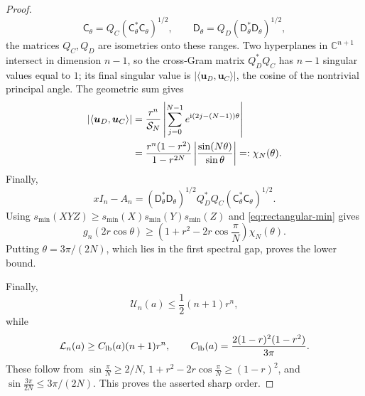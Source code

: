 \documentclass[12pt,anonymous]{iopjournal}
\numberwithin{equation}{section}
\theoremstyle{remark}
\newcommand{\C}{\mathbb C}
\newcommand{\ii}{\mathrm i}
\begin{document}
\begin{proof}
\[
 \mathsf{C}_\theta=Q_C(\mathsf{C}_\theta^*\mathsf{C}_\theta)^{1/2},
 \qquad
 \mathsf{D}_\theta=Q_D(\mathsf{D}_\theta^*\mathsf{D}_\theta)^{1/2},
\]
the matrices \(Q_C,Q_D\) are isometries onto these ranges.  Two
hyperplanes in \(\C^{n+1}\) intersect in dimension \(n-1\), so
the cross-Gram matrix \(Q_D^*Q_C\) has \(n-1\) singular values equal to
\(1\); its final singular value is
\(|\langle\boldsymbol u_D,\boldsymbol u_C\rangle|\), the cosine of the
nontrivial principal angle.  The
geometric sum gives
\begin{align}
 |\langle\boldsymbol u_D,\boldsymbol u_C\rangle|
 &=\frac{r^n}{\mathcal S_N}
 \left|\sum_{j=0}^{N-1}e^{\ii(2j-(N-1))\theta}\right|\notag\\
 &=
 \frac{r^n(1-r^2)}{1-r^{2N}}
 \left|\frac{\sin(N\theta)}{\sin\theta}\right|
 =:\chi_N(\theta).
\label{eq:chi}
\end{align}
Finally,
\[
 xI_n-A_n=(\mathsf{D}_\theta^*\mathsf{D}_\theta)^{1/2}
 Q_D^*Q_C(\mathsf{C}_\theta^*\mathsf{C}_\theta)^{1/2}.
\]
Using \(s_{\min}(XYZ)\geq
s_{\min}(X)s_{\min}(Y)s_{\min}(Z)\) and
\eqref{eq:rectangular-min} gives
\[
 g_n(2r\cos\theta)\geq
 \left(1+r^2-2r\cos\frac{\pi}{N}\right)\chi_N(\theta).
\]
Putting \(\theta=3\pi/(2N)\), which lies in the first spectral gap,
proves the lower bound.

Finally,
\[
 \mathcal U_n(a)\leq\frac12(n+1)r^n,
\]
while
\begin{equation}\label{eq:L-simple}
 \mathcal L_n(a)\geq C_{\rm lb}(a)(n+1)r^n,\qquad
 C_{\rm lb}(a)=\frac{2(1-r)^2(1-r^2)}{3\pi}.
\end{equation}
These follow from
\(\sin\frac{\pi}{N}\geq2/N\),
\(1+r^2-2r\cos\frac{\pi}{N}\geq(1-r)^2\), and
\(\sin\frac{3\pi}{2N}\leq3\pi/(2N)\).  This proves the asserted sharp
order.
\end{proof}
\end{document}
